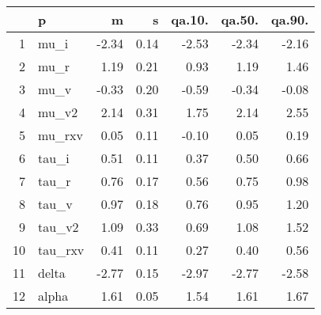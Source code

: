 \begin{table}[ht]
\centering
\begin{tabular}{rlrrrrr}
  \hline
 & p & m & s & qa.10. & qa.50. & qa.90. \\ 
  \hline
1 & mu\_i & -2.34 & 0.14 & -2.53 & -2.34 & -2.16 \\ 
  2 & mu\_r & 1.19 & 0.21 & 0.93 & 1.19 & 1.46 \\ 
  3 & mu\_v & -0.33 & 0.20 & -0.59 & -0.34 & -0.08 \\ 
  4 & mu\_v2 & 2.14 & 0.31 & 1.75 & 2.14 & 2.55 \\ 
  5 & mu\_rxv & 0.05 & 0.11 & -0.10 & 0.05 & 0.19 \\ 
  6 & tau\_i & 0.51 & 0.11 & 0.37 & 0.50 & 0.66 \\ 
  7 & tau\_r & 0.76 & 0.17 & 0.56 & 0.75 & 0.98 \\ 
  8 & tau\_v & 0.97 & 0.18 & 0.76 & 0.95 & 1.20 \\ 
  9 & tau\_v2 & 1.09 & 0.33 & 0.69 & 1.08 & 1.52 \\ 
  10 & tau\_rxv & 0.41 & 0.11 & 0.27 & 0.40 & 0.56 \\ 
  11 & delta & -2.77 & 0.15 & -2.97 & -2.77 & -2.58 \\ 
  12 & alpha & 1.61 & 0.05 & 1.54 & 1.61 & 1.67 \\ 
   \hline
\end{tabular}
\label{tab:param}
\end{table}
